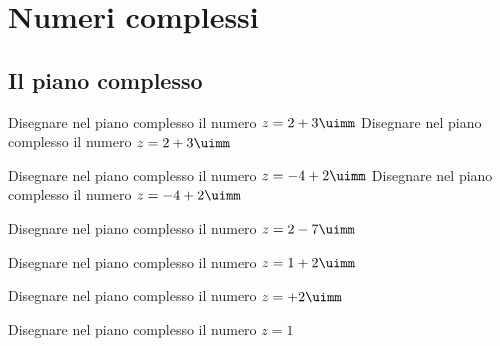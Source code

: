 \chapter{Numeri complessi}
\label{cha:numericomplessibase}
 \section{Il piano complesso}
 \tcbstartrecording
 \begin{exercise}
Disegnare nel piano complesso il numero $z=2+3\uimm$
\tcblower
Disegnare nel piano complesso il numero $z=2+3\uimm$
\begin{center}

\label{fig:disegnopianocomplesso01}
\end{center}
 \end{exercise}
  \begin{exercise}
  	Disegnare nel piano complesso il numero $z=-4+2\uimm$
  	\tcblower
  	Disegnare nel piano complesso il numero $z=-4+2\uimm$
  	\begin{center}
  		
  		\label{fig:disegnopianocomplesso02}
  	\end{center}
  \end{exercise}
\begin{exercise}[no solution]
	Disegnare nel piano complesso il numero $z=2-7\uimm$
\end{exercise}
\begin{exercise}[no solution]
	Disegnare nel piano complesso il numero $z=1+2\uimm$
\end{exercise}
\begin{exercise}[no solution]
Disegnare nel piano complesso il numero $z=+2\uimm$
\end{exercise}
\begin{exercise}[no solution]
	Disegnare nel piano complesso il numero $z=1$
\end{exercise}

